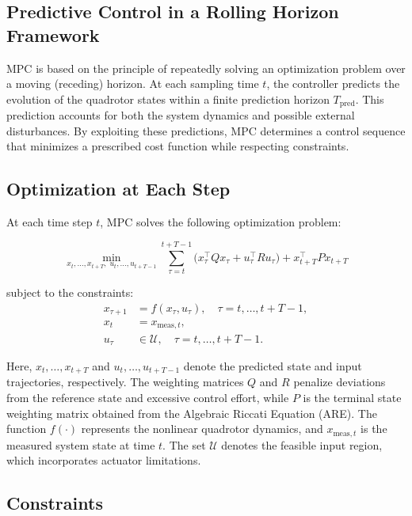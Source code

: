 \documentclass[a4paper,11pt,oneside]{book}
\begin{document}
\subsection{Predictive Control in a Rolling Horizon Framework}

MPC is based on the principle of repeatedly solving an optimization problem over a moving (receding) horizon. At each sampling time $t$, the controller predicts the evolution of the quadrotor states within a finite prediction horizon $T_{\text{pred}}$. This prediction accounts for both the system dynamics and possible external disturbances. By exploiting these predictions, MPC determines a control sequence that minimizes a prescribed cost function while respecting constraints.  

\subsection{Optimization at Each Step}

At each time step $t$, MPC solves the following optimization problem:  

\begin{equation}
\min_{x_t,\ldots,x_{t+T}, \; u_t,\ldots,u_{t+T-1}} 
\sum_{\tau=t}^{t+T-1} 
\Big( x_\tau^\top Q x_\tau + u_\tau^\top R u_\tau \Big) 
+ x_{t+T}^\top P x_{t+T}
\label{eq:mpc_cost}
\end{equation}

subject to the constraints:
\begin{align}
x_{\tau+1} &= f(x_\tau, u_\tau), \quad \tau = t, \ldots, t+T-1, \nonumber\\
x_t &= x_{\text{meas},t}, \nonumber\\
u_\tau &\in \mathcal{U}, \quad \tau = t, \ldots, t+T-1. \nonumber
\end{align}

Here, $x_t,\ldots,x_{t+T}$ and $u_t,\ldots,u_{t+T-1}$ denote the predicted state and input trajectories, respectively. The weighting matrices $Q$ and $R$ penalize deviations from the reference state and excessive control effort, while $P$ is the terminal state weighting matrix obtained from the Algebraic Riccati Equation (ARE). The function $f(\cdot)$ represents the nonlinear quadrotor dynamics, and $x_{\text{meas},t}$ is the measured system state at time $t$. The set $\mathcal{U}$ denotes the feasible input region, which incorporates actuator limitations.  

\subsection{Constraints}
\end{document}
